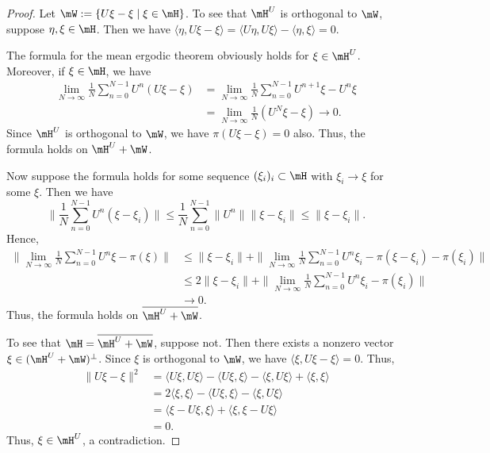 \documentclass{article}
\begin{document}
\begin{proof}
  Let $\mW := \{U \xi - \xi  \mid \xi \in \mH \}$.  To see that $\mH^U$ is orthogonal to $\mW$, suppose $\eta, \xi \in \mH$.  Then we have $\langle \eta, U \xi - \xi \rangle = \langle U \eta, U \xi \rangle - \langle \eta, \xi \rangle = 0$.  

  The formula for the mean ergodic theorem obviously holds for $\xi \in \mH^U$.  Moreover, if $\xi \in \mH$, we have
  \begin{align*}
    \lim_{N \to \infty} \frac{1}{N} \sum_{n = 0}^{N -1} U^n (U \xi - \xi) & =  \lim_{N \to \infty} \frac{1}{N} \sum_{n = 0}^{N -1} U^{n+1} \xi - U^n \xi \\
    & =  \lim_{N \to \infty} \frac{1}{N} (U^N \xi -  \xi)
    \to 0.
  \end{align*}
  Since $\mH^U$ is orthogonal to $\mW$, we have $\pi(U \xi - \xi) = 0$ also.  Thus, the formula holds on $\mH^U + \mW$.

  Now suppose the formula holds for some sequence $(\xi_i)_i \subset \mH$ with $\xi_i \to \xi$ for some $\xi$.  Then we have
  $$ \| \frac{1}{N} \sum_{n = 0}^{N-1} U^n (\xi -\xi_i) \| \le   \frac{1}{N} \sum_{n = 0}^{N-1} \|U^n\| \| \xi -\xi_i \| \le \| \xi -\xi_i \|.$$
  Hence,
  \begin{align*}
    \| \lim_{N \to \infty} \frac{1}{N} \sum_{n = 0}^{N -1} U^n \xi - \pi(\xi) \| & \le \|\xi - \xi_i\| + \|\lim_{N \to \infty} \frac{1}{N} \sum_{n = 0}^{N -1} U^n \xi_i - \pi(\xi - \xi_i) - \pi(\xi_i) \| \\
    & \le 2 \|\xi - \xi_i\|  +  \| \lim_{N \to \infty} \frac{1}{N} \sum_{n = 0}^{N -1} U^n \xi_i - \pi(\xi_i) \| \\
    & \to 0.
  \end{align*}
  Thus, the formula holds on $\overline{\mH^U + \mW}$.

  To see that $\mH = \overline{\mH^U + \mW}$, suppose not.  Then there exists a nonzero vector $\xi \in (\mH^U + \mW)^\perp$.  Since $\xi$ is orthogonal to $\mW$, we have $\langle \xi, U \xi - \xi \rangle = 0$.  Thus,
  \begin{align*}
    \| U \xi - \xi \|^2 & = \langle U \xi , U \xi \rangle - \langle U \xi, \xi \rangle - \langle \xi, U \xi \rangle + \langle \xi, \xi \rangle \\
    & = 2 \langle \xi, \xi \rangle - \langle U \xi, \xi \rangle - \langle \xi, U \xi \rangle  \\
    & = \langle \xi - U \xi, \xi \rangle + \langle \xi, \xi - U \xi \rangle \\
    & = 0.
  \end{align*}
  Thus, $\xi \in \mH^U$, a contradiction.
\end{proof}
\end{document}
